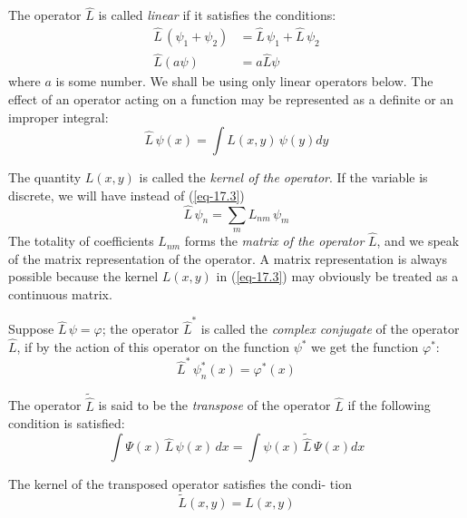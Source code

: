 \documentclass[a4paper,sfsidenotes,colorlinks=true]{tufte-book}
\numberwithin{equation}{section}
\numberwithin{figure}{section}
\begin{document}
The operator $\hat{L}$ is called \emph{linear} if it satisfies the conditions:
\begin{equation}%
\begin{split}
\hat{L} \, (\psi_{1} + \psi_{2} ) & = \hat{L} \, \psi_{1} + \hat{L}
\, \psi_{2}\\
\hat{L}(a \psi) & = a \hat{L} \psi
\end{split}
\label{eq-17.2} 
\end{equation}
where $a$ is some number. We shall be using only linear operators
below. The effect of an operator acting on a function may be
represented as a definite or an improper integral:
\begin{equation}%
\hat{L} \, \psi (x) = \int L (x, y) \, \psi (y) dy
\label{eq-17.3} 
\end{equation}

The quantity $L (x, y)$ is called the \emph{kernel of the operator}.
If the variable is discrete, we will have instead of (\ref{eq-17.3})
\begin{equation}%
\hat{L} \, \psi_{n} = \sum_{m} L_{nm} \, \psi_{m} 
\label{eq-17.4} 
\end{equation}
The totality of coefficients $L_{nm}$ forms the \emph{matrix of the
  operator} $\hat{L}$, and we speak of the matrix representation of
the operator. A matrix representation is always possible because the
kernel $L (x, y)$ in (\ref{eq-17.3}) may obviously be treated as a
continuous matrix.

Suppose $\hat{L} \, \psi  = \varphi$; the operator $\hat{L}^{*}$ is called the \emph{complex
conjugate} of the operator $\hat{L}$, if by the action of this operator on
the function $\psi^{*}$ we get the function $\varphi^{*}$:
\begin{equation}%
\hat{L}^{*} \, \psi_{n}^{*} (x) = \varphi^{*}(x)
\label{eq-17.5} 
\end{equation}

The operator $\widetilde{\hat{L}}$ is said to be the \emph{transpose} of the operator
$\hat{L}$ if the following condition is satisfied:
\begin{equation}%
  \int \Psi (x) \, \hat{L} \, \psi (x) \, dx = \int \psi (x) \,
  \widetilde{\hat{L}} \, \Psi (x) dx
\label{eq-17.6} 
\end{equation}

The kernel of the transposed operator satisfies the condi- tion 
\begin{equation}%
\tilde{L} (x,y) = L(x,y)
\label{eq-17.7} 
\end{equation}
\end{document}
